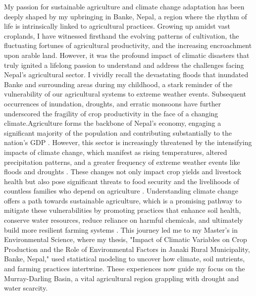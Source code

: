 My passion for sustainable agriculture and climate change  adaptation has been deeply shaped by my upbringing in Banke, Nepal, a region where the rhythm of life is intrinsically linked to agricultural practices. Growing up amidst vast croplands, I have witnessed firsthand the evolving patterns of cultivation, the fluctuating fortunes of agricultural productivity, and the increasing encroachment upon arable land. However, it was the profound impact of climatic disasters that truly ignited a lifelong passion to understand and address the challenges facing Nepal's agricultural sector. I vividly recall the devastating floods that inundated Banke and surrounding areas during my childhood, a stark reminder of the vulnerability of our agricultural systems to extreme weather events. Subsequent occurrences of inundation, droughts, and erratic monsoons have further underscored the fragility of crop productivity in the face of a changing climate.Agriculture forms the backbone of Nepal's economy, engaging a significant majority of the population and contributing substantially to the nation's GDP \parencite{krupnikAgronomicSocioeconomicEnvironmental2021}. However, this sector is increasingly threatened by the intensifying impacts of climate change, which manifest as rising temperatures, altered precipitation patterns, and a greater frequency of extreme weather events like floods and droughts \parencite{dawadiImpactClimateChange2022}. These changes not only impact crop yields and livestock health but also pose significant threats to food security and the livelihoods of countless families who depend on agriculture \parencite{risalImpactClimateChange2022}. Understanding climate change offers a path towards sustainable agriculture, which is a promising pathway to mitigate these vulnerabilities by promoting practices that enhance soil health, conserve water resources, reduce reliance on harmful chemicals, and ultimately build more resilient farming systems \parencite{factors_dahal_2021}. This journey led me to my Master’s in Environmental Science, where my thesis, "Impact of Climatic Variables on Crop Production and the Role of Environmental Factors in Janaki Rural Municipality, Banke, Nepal," used statistical modeling to uncover how climate, soil nutrients, and farming practices intertwine. These experiences now guide my focus on the Murray-Darling Basin, a vital agricultural region grappling with drought and water scarcity. 


